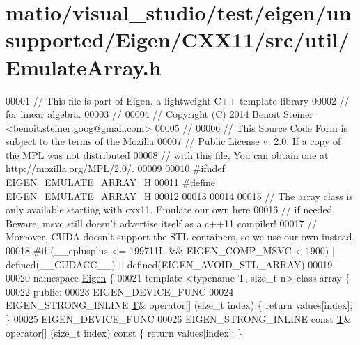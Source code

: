\hypertarget{matio_2visual__studio_2test_2eigen_2unsupported_2_eigen_2_c_x_x11_2src_2util_2_emulate_array_8h_source}{}\section{matio/visual\+\_\+studio/test/eigen/unsupported/\+Eigen/\+C\+X\+X11/src/util/\+Emulate\+Array.h}
\label{matio_2visual__studio_2test_2eigen_2unsupported_2_eigen_2_c_x_x11_2src_2util_2_emulate_array_8h_source}

\begin{DoxyCode}
00001 \textcolor{comment}{// This file is part of Eigen, a lightweight C++ template library}
00002 \textcolor{comment}{// for linear algebra.}
00003 \textcolor{comment}{//}
00004 \textcolor{comment}{// Copyright (C) 2014 Benoit Steiner <benoit.steiner.goog@gmail.com>}
00005 \textcolor{comment}{//}
00006 \textcolor{comment}{// This Source Code Form is subject to the terms of the Mozilla}
00007 \textcolor{comment}{// Public License v. 2.0. If a copy of the MPL was not distributed}
00008 \textcolor{comment}{// with this file, You can obtain one at http://mozilla.org/MPL/2.0/.}
00009 
00010 \textcolor{preprocessor}{#ifndef EIGEN\_EMULATE\_ARRAY\_H}
00011 \textcolor{preprocessor}{#define EIGEN\_EMULATE\_ARRAY\_H}
00012 
00013 
00014 
00015 \textcolor{comment}{// The array class is only available starting with cxx11. Emulate our own here}
00016 \textcolor{comment}{// if needed. Beware, msvc still doesn't advertise itself as a c++11 compiler!}
00017 \textcolor{comment}{// Moreover, CUDA doesn't support the STL containers, so we use our own instead.}
00018 \textcolor{preprocessor}{#if (\_\_cplusplus <= 199711L && EIGEN\_COMP\_MSVC < 1900) || defined(\_\_CUDACC\_\_) ||
       defined(EIGEN\_AVOID\_STL\_ARRAY)}
00019 
00020 \textcolor{keyword}{namespace }\hyperlink{namespace_eigen}{Eigen} \{
00021 \textcolor{keyword}{template} <\textcolor{keyword}{typename} T, \textcolor{keywordtype}{size\_t} n> \textcolor{keyword}{class }array \{
00022  \textcolor{keyword}{public}:
00023   EIGEN\_DEVICE\_FUNC
00024   EIGEN\_STRONG\_INLINE \hyperlink{group___sparse_core___module_class_eigen_1_1_triplet}{T}& operator[] (\textcolor{keywordtype}{size\_t} index) \{ \textcolor{keywordflow}{return} values[index]; \}
00025   EIGEN\_DEVICE\_FUNC
00026   EIGEN\_STRONG\_INLINE \textcolor{keyword}{const} \hyperlink{group___sparse_core___module_class_eigen_1_1_triplet}{T}& operator[] (\textcolor{keywordtype}{size\_t} index)\textcolor{keyword}{ const }\{ \textcolor{keywordflow}{return} values[index]; \}

\end{DoxyCode}
